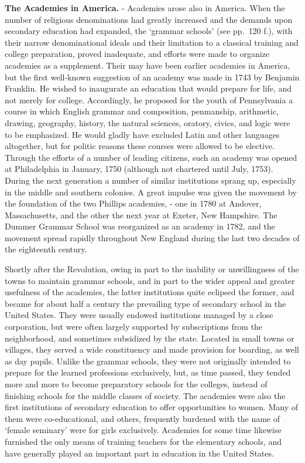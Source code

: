 \documentclass[
]{book}
\begin{document}
\textbf{The Academies in America.} - Academies arose also in America. When the number of religious denominations had greatly increased and the demands upon secondary education had expanded, the `grammar schools' (see pp.~120 f.), with their narrow denominational ideals and their limitation to a classical training and college preparation, proved inadequate, and efforts were made to organize academies as a supplement. Their may have been earlier academies in America, but the first well-known suggestion of an academy was made in 1743 by Benjamin Franklin. He wished to inaugurate an education that would prepare for life, and not merely for college. Accordingly, he proposed for the youth of Pennsylvania a course in which English grammar and composition, penmanship, arithmetic, drawing, geography, history, the natural sciences, oratory, civics, and logic were to be emphasized. He would gladly have excluded Latin and other languages altogether, but for politic reasons these courses were allowed to be elective. Through the efforts of a number of leading citizens, such an academy was opened at Philadelphia in January, 1750 (although not chartered until July, 1753). During the next generation a number of similar institutions sprang up, especially in the middle and southern colonies. A great impulse was given the movement by the foundation of the two Phillips academies, - one in 1780 at Andover, Massachusetts, and the other the next year at Exeter, New Hampshire. The Dummer Grammar School was reorganized as an academy in 1782, and the movement spread rapidly throughout New England during the last two decades of the eighteenth century.

Shortly after the Revolution, owing in part to the inability or unwillingness of the towns to maintain grammar schools, and in part to the wider appeal and greater usefulness of the academies, the latter institutions quite eclipsed the former, and became for about half a century the prevailing type of secondary school in the United States. They were usually endowed institutions managed by a close corporation, but were often largely supported by subscriptions from the neighborhood, and sometimes subsidized by the state. Located in small towns or villages, they served a wide constituency and made provision for boarding, as well as day pupils. Unlike the grammar schools, they were not originally intended to prepare for the learned professions exclusively, but, as time passed, they tended more and more to become preparatory schools for the colleges, instead of finishing schools for the middle classes of society. The academies were also the first institutions of secondary education to offer opportunities to women. Many of them were co-educational, and others, frequently burdened with the name of `female seminary' were for girls exclusively. Academies for some time likewise furnished the only means of training teachers for the elementary schools, and have generally played an important part in education in the United States.
\end{document}

